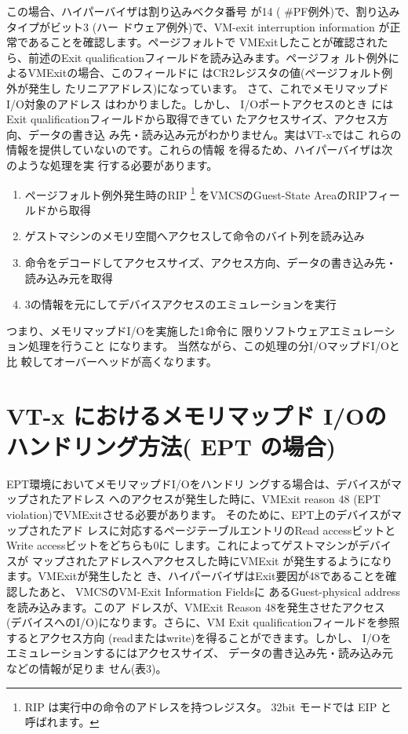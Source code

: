  この場合、ハイパーバイザは割り込みベクタ番号
が14 ( \#PF例外)で、割り込みタイプがビット3 (ハー
ドウェア例外)で、VM-exit interruption information
が正常であることを確認します。ページフォルトで
VMExitしたことが確認されたら、前述のExit
qualificationフィールドを読み込みます。ページフォ
ルト例外によるVMExitの場合、このフィールドに
はCR2レジスタの値(ページフォルト例外が発生し
たリニアアドレス)になっています。
 さて、これでメモリマップドI/O対象のアドレス
はわかりました。しかし、 I/Oポートアクセスのとき
にはExit qualificationフィールドから取得できてい
たアクセスサイズ、アクセス方向、データの書き込
み先・読み込み元がわかりません。実はVT-xではこ
れらの情報を提供していないのです。これらの情報
を得るため、ハイパーバイザは次のような処理を実
行する必要があります。

\begin{enumerate}

\item{ページフォルト例外発生時のRIP
  \footnote[2]{
  RIP は実行中の命令のアドレスを持つレジスタ。 32bit モードでは EIP と呼ばれます。
  }
をVMCSのGuest-State AreaのRIPフィールドから取得}
\item{ゲストマシンのメモリ空間へアクセスして命令のバイト列を読み込み}
\item{命令をデコードしてアクセスサイズ、アクセス方向、データの書き込み先・読み込み元を取得}
\item{3の情報を元にしてデバイスアクセスのエミュレーションを実行}
\end{enumerate}

 つまり、メモリマップドI/Oを実施した1命令に
限りソフトウェアエミュレーション処理を行うこと
になります。
 当然ながら、この処理の分I/OマップドI/Oと比
較してオーバーヘッドが高くなります。


\section{VT-x におけるメモリマップド I/Oのハンドリング方法( EPT の場合)}

 EPT環境においてメモリマップドI/Oをハンドリ
ングする場合は、デバイスがマップされたアドレス
へのアクセスが発生した時に、VMExit reason 48
(EPT violation)でVMExitさせる必要があります。
そのために、EPT上のデバイスがマップされたアド
レスに対応するページテーブルエントリのRead
accessビットとWrite accessビットをどちらも0に
します。これによってゲストマシンがデバイスが
マップされたアドレスへアクセスした時にVMExit
が発生するようになります。VMExitが発生したと
き、ハイパーバイザはExit要因が48であることを確
認したあと、 VMCSのVM-Exit Information Fieldsに
あるGuest-physical addressを読み込みます。このア
ドレスが、VMExit Reason 48を発生させたアクセス
(デバイスへのI/O)になります。さらに、VM Exit
qualificationフィールドを参照するとアクセス方向
(readまたはwrite)を得ることができます。しかし、
I/Oをエミュレーションするにはアクセスサイズ、
データの書き込み先・読み込み元などの情報が足りま
せん(表3)。


